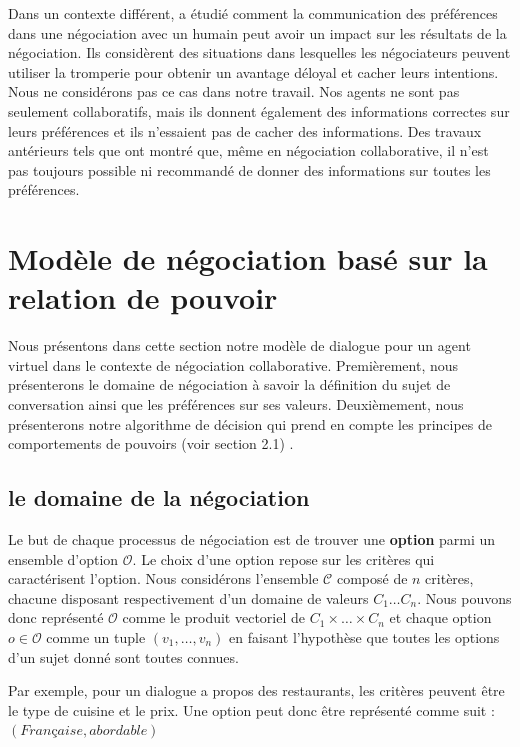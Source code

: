 		Dans un contexte différent, \cite {nazari2015opponent} a étudié comment la communication des préférences dans une négociation avec un humain peut avoir un impact sur les résultats de la négociation. Ils considèrent des situations dans lesquelles les négociateurs peuvent utiliser la tromperie pour obtenir un avantage déloyal et cacher leurs intentions. Nous ne considérons pas ce cas dans notre travail. Nos agents ne sont pas seulement collaboratifs, mais ils donnent également des informations correctes sur leurs préférences et ils n'essaient pas de cacher des informations. Des travaux antérieurs tels que \cite {swartout2006toward} ont montré que, même en négociation collaborative, il n'est pas toujours possible ni recommandé de donner des informations sur toutes les préférences.



	\section{Modèle de négociation basé sur la relation de pouvoir}
		
		Nous présentons dans cette section notre modèle de dialogue pour un agent virtuel dans le contexte de négociation collaborative. 
		Premièrement, nous présenterons le domaine de négociation à savoir la définition du sujet de conversation ainsi que les préférences sur ses valeurs. 
		Deuxièmement, nous présenterons notre algorithme de décision qui prend en compte les principes de comportements de pouvoirs (voir section 2.1) .
		
		\subsection{le domaine de la négociation}
			Le but de chaque processus de négociation est de trouver une \textbf{option} parmi un ensemble d'option $\mathcal{O}$. Le choix d'une option repose sur les critères qui caractérisent l'option.  Nous considérons l'ensemble $\mathcal{C}$ composé de $n$ critères, chacune disposant respectivement d'un domaine de valeurs  $C_1 \ldots C_n$. Nous pouvons donc représenté $\mathcal{O}$ comme le produit vectoriel de  $C_1\times\ldots\times C_n$ et chaque option $o \in \mathcal{O}$ comme un tuple $(v_1,\ldots,v_n)$ en faisant l'hypothèse que toutes les options d'un sujet donné sont toutes connues.
	
		
		Par exemple, pour un dialogue a propos des restaurants, les critères peuvent être le type de cuisine et le prix. Une option peut donc être représenté comme suit : $(Française, abordable)$
		
